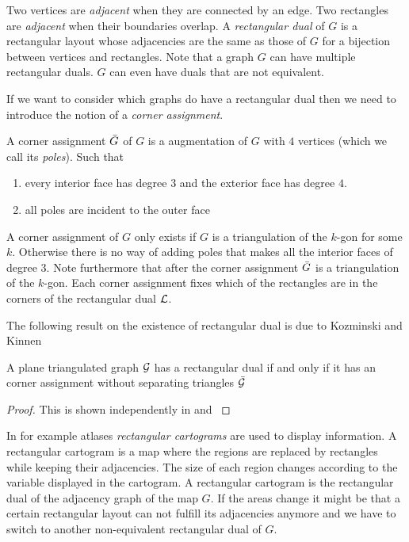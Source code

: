   Two vertices are \emph{adjacent} when they are connected by an edge. Two rectangles are \emph{adjacent} when their boundaries overlap. A \emph{rectangular dual} of $G$ is a rectangular layout whose adjacencies are the same as those of $G$ for a bijection between vertices and rectangles.
  Note that a graph $G$ can have multiple rectangular duals. $G$ can even have duals that are not equivalent.

  If we want to consider which graphs do have a rectangular dual then we need to introduce the notion of a \emph{corner assignment}.
  \begin{defi}
    A corner assignment $\bar{G}$ of $G$ is a augmentation of $G$ with $4$ vertices (which we call its \emph{poles}). Such that
    \begin{enumerate}
    \item every interior face has degree $3$ and the exterior face has degree $4$.
    \item all poles are incident to the outer face
    \end{enumerate}
  \end{defi}

  A corner assignment of $G$ only exists if $G$ is a triangulation of the $k$-gon for some $k$. Otherwise there is no way of adding poles that makes all the interior faces of degree $3$. Note furthermore that after the corner assignment $\bar{G}$ is a triangulation of the $k$-gon. Each corner assignment fixes which of the rectangles are in the corners of the rectangular dual $\mathcal{L}$.

  The following result on the existence of rectangular dual is due to Kozminski and Kinnen

  \begin{thrm}
    \label{th:rect:exsitenceREctangularDual}
    A plane triangulated graph $\mathcal{G}$ has a rectangular dual if and only if it has an corner assignment without separating triangles $\bar{\mathcal{G}}$
  \end{thrm}

  \begin{proof}
    This is shown independently in \cite{Kozminski1984} and  \cite{Ungar1953}
  \end{proof}

  In for example atlases \emph{rectangular cartograms} are used to display information. A rectangular cartogram is a map where the regions are replaced by rectangles while keeping their adjacencies. The size of each region changes according to the variable displayed in the cartogram.  A rectangular cartogram is the rectangular dual of the adjacency graph of the map $G$.
  If the areas change it might be that a certain rectangular layout can not fulfill its adjacencies anymore and we have to switch to another non-equivalent rectangular dual of $G$.


